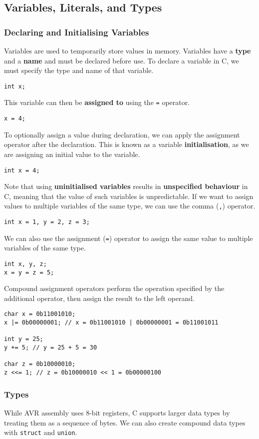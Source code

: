 \documentclass{article}
\begin{document}
\subsection{Variables, Literals, and Types}
\subsubsection{Declaring and Initialising Variables}
Variables are used to temporarily store values in memory. Variables
have a \textbf{type} and a \textbf{name} and must be declared before
use. To declare a variable in C, we must specify the type and name of
that variable.
\begin{verbatim}
int x;
\end{verbatim}
This variable can then be \textbf{assigned to} using the
\texttt{=} operator.
\begin{verbatim}
x = 4;
\end{verbatim}
To optionally assign a value during declaration, we can apply the
assignment operator after the declaration. This is known as a variable
\textbf{initialisation}, as we are assigning an initial value to the
variable.
\begin{verbatim}
int x = 4;
\end{verbatim}
Note that using \textbf{uninitialised variables} results in
\textbf{unspecified behaviour} in C, meaning that the value of such
variables is unpredictable. If we want to assign values to multiple
variables of the same type, we can use the comma (\texttt{,})
operator.
\begin{verbatim}
int x = 1, y = 2, z = 3;
\end{verbatim}
We can also use the assignment (\texttt{=}) operator to assign
the same value to multiple variables of the same type.
\begin{verbatim}
int x, y, z;
x = y = z = 5;
\end{verbatim}
Compound assignment operators perform the operation specified by the
additional operator, then assign the result to the left operand.
\begin{verbatim}
char x = 0b11001010;
x |= 0b00000001; // x = 0b11001010 | 0b00000001 = 0b11001011

int y = 25;
y += 5; // y = 25 + 5 = 30

char z = 0b10000010;
z <<= 1; // z = 0b10000010 << 1 = 0b00000100
\end{verbatim}
\subsubsection{Types}
While AVR assembly uses 8-bit registers, C supports larger data types
by treating them as a sequence of bytes. We can also create compound
data types with \texttt{struct} and \texttt{union}.
\end{document}
